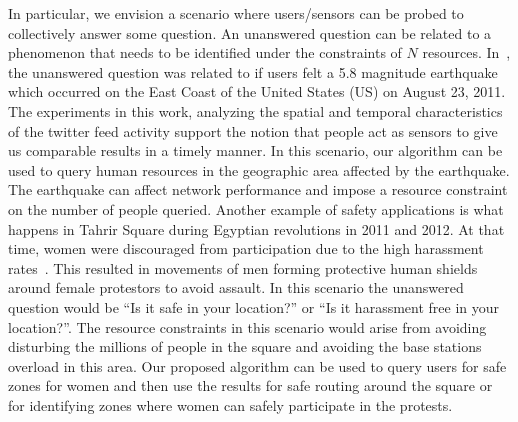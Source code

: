 \documentclass{acm_proc_article-sp}
\begin{document}
In particular, we envision a scenario where users/sensors can be probed to collectively answer some question. An unanswered question can be related to a phenomenon that needs to be identified under the constraints of $N$ resources. In~\cite{crooks2013earthquake}, the unanswered question was related to if users felt a 5.8 magnitude earthquake which occurred on the East Coast of the United States (US) on August 23, 2011. The experiments in this work, analyzing the spatial and temporal characteristics of the twitter feed activity support the notion that people act as sensors to give us comparable results in a timely manner. In this scenario, our algorithm can be used to query human resources in the geographic area affected by the earthquake. The earthquake can affect network performance and impose a resource constraint on the number of people queried. Another example of safety applications is what happens in Tahrir Square during Egyptian revolutions in 2011 and 2012. At that time, women were discouraged from participation due to the high harassment rates~\cite{guardianSH}. This resulted in movements of men forming protective human shields~\cite{worldPostHS} around female protestors to avoid assault. In this scenario the unanswered question would be ``Is it safe in your location?'' or ``Is it harassment free in your location?''. The resource constraints in this scenario would arise from avoiding disturbing the millions of people in the square and avoiding the base stations overload in this area. 
Our proposed algorithm can be used to query users for safe zones for women and then use the results for safe routing around the square or for identifying zones where women can safely participate in the protests. \par
\end{document}
